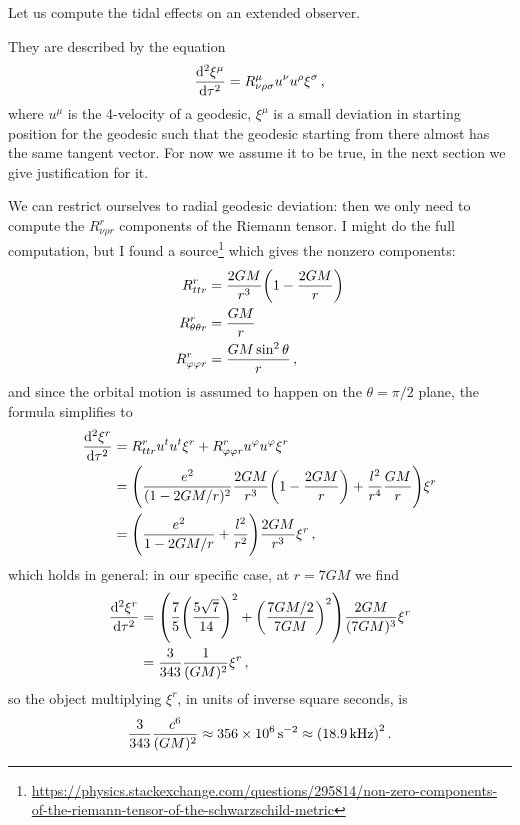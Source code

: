 \documentclass[main.tex]{subfiles}
\begin{document}
Let us compute the tidal effects on an extended observer. 

They are described by the equation 
%
\begin{align}
  \dv[2]{\xi^{\mu }}{\tau } = R^{\mu }_{\nu \rho \sigma } u^{\nu } u^{\rho } \xi^{\sigma }
\,,
\end{align}
%
where \(u^{\mu }\) is the 4-velocity of a geodesic, \(\xi^{ \mu } \) is a small deviation in starting position for the geodesic such that the geodesic starting from there almost has the same tangent vector. For now we assume it to be true, in the next section we give justification for it. 

We can restrict ourselves to radial geodesic deviation: then we only need to compute the \(R^{r}_{\nu \rho r}\) components of the Riemann tensor. 
I might do the full computation, but I found a source\footnote{\url{https://physics.stackexchange.com/questions/295814/non-zero-components-of-the-riemann-tensor-of-the-schwarzschild-metric}} which gives the nonzero components: 
%
\begin{align}
  R^{r}_{ttr} &= \frac{2GM}{r^3} \qty(1 - \frac{2GM}{r}) \\
  R^{r}_{\theta \theta r} &= \frac{GM}{r} \\
  R^{r}_{\varphi \varphi r} &= \frac{G M \sin^2\theta}{r} 
\,,
\end{align}
%
and since the orbital motion is assumed to happen on the \(\theta = \pi /2\) plane, the formula simplifies to 
%
\begin{align}
  \dv[2]{\xi^{r}}{\tau } &= R^{r}_{ttr} u^{t} u^{t} \xi^{r} 
  + R^{r }_{\varphi \varphi r} u^{\varphi } u^{\varphi } \xi^{r}  \\
  &= \qty(\frac{e^2}{(1-2GM/r)^2} \frac{2GM}{r^{3}}\qty(1 - \frac{2GM}{r}) +  \frac{l^2}{r^{4}} \frac{GM}{r}) \xi^{r}  \\
  &= \qty(\frac{e^2}{1-2GM/r} + \frac{l^2}{r^2} ) \frac{2GM}{r^3} \xi^{r}
\,,
\end{align}
%
which holds in general: in our specific case, at \(r = 7GM \) we find 
%
\begin{align}
  \dv[2]{\xi^{r}}{\tau } &= \qty(\frac{7}{5} \qty(\frac{5 \sqrt{7}}{14})^2 + \qty(\frac{7GM/2}{7GM})^2 ) \frac{2GM}{(7GM)^3}  \xi^{r}  \\
  &= \frac{3}{343} \frac{1}{(GM)^2} \xi^{r}
\,,
\end{align}
%
so the object multiplying \(\xi^{r}\), in units of inverse square seconds, is 
%
\begin{align}
  \frac{3}{343} \frac{c^{6}}{(GM)^2} \approx \SI{356e6}{s^{-2}}
  \approx \qty(\SI{18.9}{kHz})^2
\,. 
\end{align}
\end{document}
